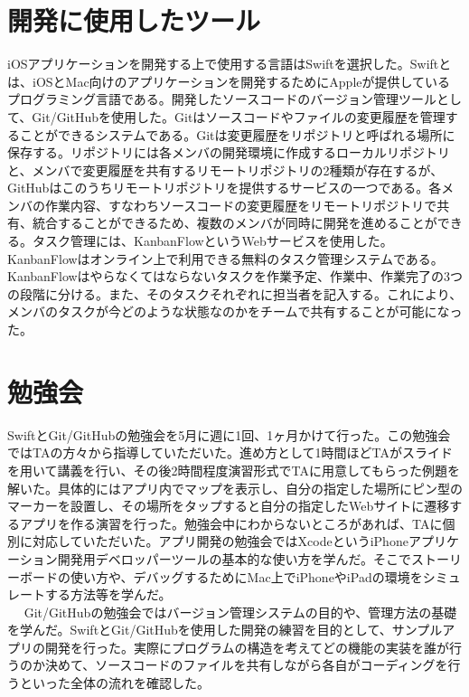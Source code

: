 \section{開発に使用したツール}

iOSアプリケーションを開発する上で使用する言語はSwiftを選択した。Swiftとは、iOSとMac向けのアプリケーションを開発するためにAppleが提供しているプログラミング言語である。開発したソースコードのバージョン管理ツールとして、Git/GitHubを使用した。Gitはソースコードやファイルの変更履歴を管理することができるシステムである。Gitは変更履歴をリポジトリと呼ばれる場所に保存する。リポジトリには各メンバの開発環境に作成するローカルリポジトリと、メンバで変更履歴を共有するリモートリポジトリの2種類が存在するが、GitHubはこのうちリモートリポジトリを提供するサービスの一つである。各メンバの作業内容、すなわちソースコードの変更履歴をリモートリポジトリで共有、統合することができるため、複数のメンバが同時に開発を進めることができる。タスク管理には、KanbanFlowというWebサービスを使用した。KanbanFlowはオンライン上で利用できる無料のタスク管理システムである。KanbanFlowはやらなくてはならないタスクを作業予定、作業中、作業完了の3つの段階に分ける。また、そのタスクそれぞれに担当者を記入する。これにより、メンバのタスクが今どのような状態なのかをチームで共有することが可能になった。

\section{勉強会}
SwiftとGit/GitHubの勉強会を5月に週に1回、1ヶ月かけて行った。この勉強会ではTAの方々から指導していただいた。進め方として1時間ほどTAがスライドを用いて講義を行い、その後2時間程度演習形式でTAに用意してもらった例題を解いた。具体的にはアプリ内でマップを表示し、自分の指定した場所にピン型のマーカーを設置し、その場所をタップすると自分の指定したWebサイトに遷移するアプリを作る演習を行った。勉強会中にわからないところがあれば、TAに個別に対応していただいた。アプリ開発の勉強会ではXcodeというiPhoneアプリケーション開発用デベロッパーツールの基本的な使い方を学んだ。そこでストーリーボードの使い方や、デバッグするためにMac上でiPhoneやiPadの環境をシミュレートする方法等を学んだ。\\　
Git/GitHubの勉強会ではバージョン管理システムの目的や、管理方法の基礎を学んだ。SwiftとGit/GitHubを使用した開発の練習を目的として、サンプルアプリの開発を行った。実際にプログラムの構造を考えてどの機能の実装を誰が行うのか決めて、ソースコードのファイルを共有しながら各自がコーディングを行うといった全体の流れを確認した。

